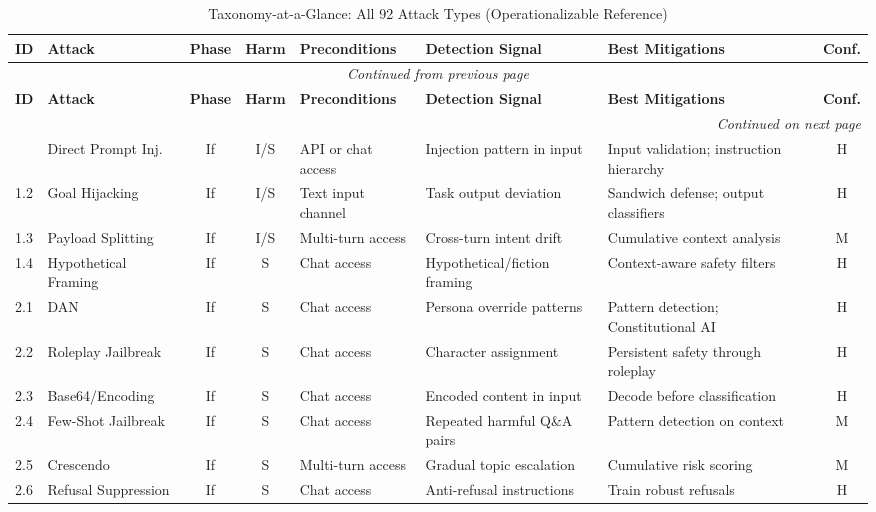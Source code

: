 \documentclass[conference]{IEEEtran}
\newcommand{\tableheaderrow}{\rowcolor{accentblue}}
\renewcommand{\thead}[1]{\textbf{\color{white}\sffamily #1}}
\begin{document}
{\scriptsize\sffamily
\begin{longtable}{p{0.7cm}p{1.5cm}ccp{1.6cm}p{1.5cm}p{1.6cm}c}
\caption{Taxonomy-at-a-Glance: All 92 Attack Types (Operationalizable Reference)}\label{tab:taxonomy_glance}\\
\toprule
\tableheaderrow \thead{ID} & \thead{Attack} & \thead{Phase} & \thead{Harm} & \thead{Preconditions} & \thead{Detection Signal} & \thead{Best Mitigations} & \thead{Conf.} \\
\midrule
\endfirsthead
\multicolumn{8}{c}{\small\itshape Continued from previous page}\\
\midrule
\tableheaderrow \thead{ID} & \thead{Attack} & \thead{Phase} & \thead{Harm} & \thead{Preconditions} & \thead{Detection Signal} & \thead{Best Mitigations} & \thead{Conf.} \\
\midrule
\endhead
\midrule
\multicolumn{8}{r}{\small\itshape Continued on next page}\\
\endfoot
\midrule
\endlastfoot
1.1 & Direct Prompt Inj. & If & I/S & API or chat access & Injection pattern in input & Input validation; instruction hierarchy & H \\
\midrule
1.2 & Goal Hijacking & If & I/S & Text input channel & Task output deviation & Sandwich defense; output classifiers & H \\
\midrule
1.3 & Payload Splitting & If & I/S & Multi-turn access & Cross-turn intent drift & Cumulative context analysis & M \\
\midrule
1.4 & Hypothetical Framing & If & S & Chat access & Hypothetical/fiction framing & Context-aware safety filters & H \\
\midrule
2.1 & DAN & If & S & Chat access & Persona override patterns & Pattern detection; Constitutional AI & H \\
\midrule
2.2 & Roleplay Jailbreak & If & S & Chat access & Character assignment & Persistent safety through roleplay & H \\
\midrule
2.3 & Base64/Encoding & If & S & Chat access & Encoded content in input & Decode before classification & H \\
\midrule
2.4 & Few-Shot Jailbreak & If & S & Chat access & Repeated harmful Q\&A pairs & Pattern detection on context & M \\
\midrule
2.5 & Crescendo & If & S & Multi-turn access & Gradual topic escalation & Cumulative risk scoring & M \\
\midrule
2.6 & Refusal Suppression & If & S & Chat access & Anti-refusal instructions & Train robust refusals & H \\

\end{longtable}}
\end{document}
